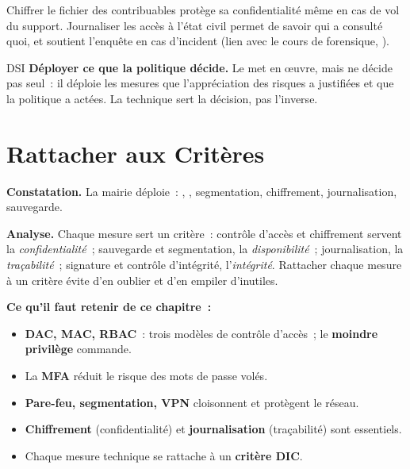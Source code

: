 Chiffrer le fichier des contribuables protège sa confidentialité même en cas de
vol du support. Journaliser les accès à l'état civil permet de savoir qui a
consulté quoi, et soutient l'enquête en cas d'incident (lien avec le cours de
forensique, ).

\begin{boxmetier}{DSI}
\textbf{Déployer ce que la politique décide.} Le  met en \oe uvre,
mais ne décide pas seul~: il déploie les mesures que l'appréciation des risques
a justifiées et que la politique a actées. La technique sert la décision, pas
l'inverse.
\end{boxmetier}

\section{Rattacher aux Critères}
\label{sec:c16-dic}

\begin{boxprocedure}
\textbf{Constatation.} La mairie déploie~: , ,
segmentation, chiffrement, journalisation, sauvegarde.

\medskip
\textbf{Analyse.} Chaque mesure sert un critère~: contrôle d'accès et
chiffrement servent la \emph{confidentialité}~; sauvegarde et segmentation, la
\emph{disponibilité}~; journalisation, la \emph{traçabilité}~; signature et
contrôle d'intégrité, l'\emph{intégrité}. Rattacher chaque mesure à un critère
évite d'en oublier et d'en empiler d'inutiles.
\end{boxprocedure}

\separateur

\begin{boxresume}
\textbf{Ce qu'il faut retenir de ce chapitre~:}
\begin{itemize}
    \item \textbf{DAC, MAC, RBAC}~: trois modèles de contrôle d'accès~; le
          \textbf{moindre privilège} commande.
    \item La \textbf{MFA} réduit le risque des mots de passe volés.
    \item \textbf{Pare-feu, segmentation, VPN} cloisonnent et protègent le
          réseau.
    \item \textbf{Chiffrement} (confidentialité) et \textbf{journalisation}
          (traçabilité) sont essentiels.
    \item Chaque mesure technique se rattache à un \textbf{critère DIC}.
\end{itemize}
\end{boxresume}

